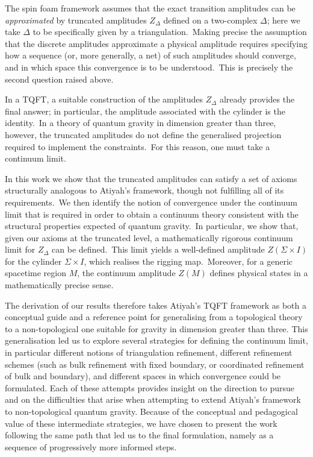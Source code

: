 \documentclass[11pt]{article}
\theoremstyle{definition}
\numberwithin{equation}{section}
\begin{document}
The spin foam framework assumes that the exact transition amplitudes can be {\em approximated} by truncated amplitudes $Z_\Delta$ defined on a two-complex $\Delta$; here we take $\Delta$ to be specifically given by a triangulation.~Making precise the assumption that the discrete amplitudes  approximate a physical amplitude  requires specifying how a sequence (or, more generally, a net) of such amplitudes should converge, and in which space this convergence is to be understood.~This is precisely the second question raised above.

In a TQFT, a suitable construction of the amplitudes $Z_\Delta$ already provides the final answer; in particular, the amplitude associated with the cylinder is the identity.~In a theory of quantum gravity in dimension greater than three, however, the truncated amplitudes do not define the generalised projection required to implement the constraints.~For this reason, one must take a continuum limit.

In this work we show that the truncated amplitudes can satisfy a set of axioms structurally analogous to Atiyah’s framework, though not fulfilling all of its requirements.~We then identify the notion of convergence under the continuum limit that is required in order to obtain a continuum theory consistent with the structural properties expected of quantum gravity.~In particular, we show that, given our axioms at the truncated level, a mathematically rigorous continuum limit for $Z_\Delta$ can be defined.~This limit yields a well-defined amplitude $Z(\Sigma \times I)$ for the cylinder $\Sigma \times I$, which realises the rigging map.~Moreover, for a generic spacetime region $M$, the continuum amplitude $Z(M)$ defines physical states in a mathematically precise sense.

The derivation of our results therefore takes Atiyah’s TQFT framework as both a conceptual guide and a reference point for generalising from a topological theory to a non-topological one suitable for gravity in dimension greater than three. This  generalisation led us to explore several strategies for defining the continuum limit, in particular different notions of triangulation refinement, different refinement schemes (such as bulk refinement with fixed boundary, or coordinated refinement of bulk and boundary), and different spaces in which convergence could be formulated. Each of these attempts provides insight on the direction to pursue and on the difficulties that arise when attempting to extend Atiyah’s framework to non-topological quantum gravity. Because of the conceptual and pedagogical value of these intermediate strategies, we have chosen to present the work following the same path that led us to the final formulation, namely as a sequence of progressively more informed steps.
\end{document}
